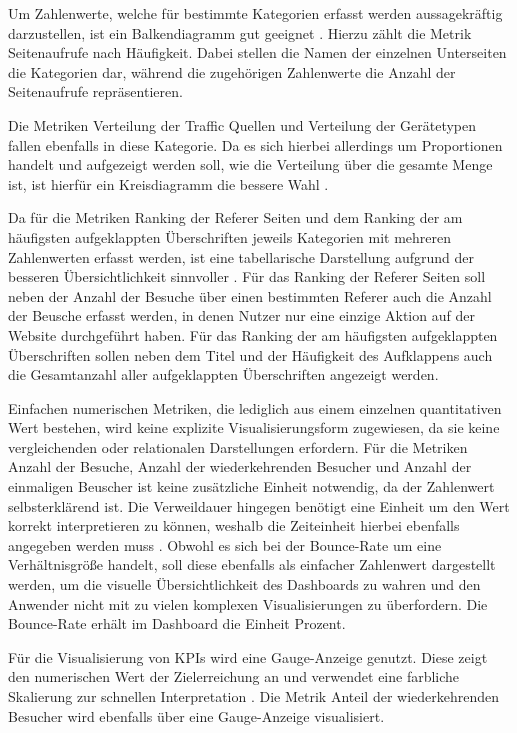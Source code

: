 Um Zahlenwerte, welche für bestimmte Kategorien erfasst werden aussagekräftig darzustellen, ist ein Balkendiagramm gut geeignet \parencite[Kap.5]{Wilke}. Hierzu zählt die Metrik \glqq Seitenaufrufe nach Häufigkeit\grqq{}. Dabei stellen die Namen der einzelnen Unterseiten die Kategorien dar, während die zugehörigen Zahlenwerte die Anzahl der Seitenaufrufe repräsentieren.

Die Metriken \glqq Verteilung der Traffic Quellen\grqq{} und \glqq Verteilung der Gerätetypen\grqq{} fallen ebenfalls in diese Kategorie. Da es sich hierbei allerdings um Proportionen handelt und aufgezeigt werden soll, wie die Verteilung über die gesamte Menge ist, ist hierfür ein Kreisdiagramm die bessere Wahl \parencite[Kap.5]{Wilke}.

Da für die Metriken \glqq Ranking der Referer Seiten\grqq{} und dem \glqq Ranking der am häufigsten aufgeklappten Überschriften\grqq{} jeweils Kategorien mit mehreren Zahlenwerten erfasst werden, ist eine tabellarische Darstellung aufgrund der besseren Übersichtlichkeit sinnvoller \parencite{Auditrium}. Für das \glqq Ranking der Referer Seiten\grqq{} soll neben der Anzahl der Besuche über einen bestimmten Referer auch die Anzahl der Beusche erfasst werden, in denen Nutzer nur eine einzige Aktion auf der Website durchgeführt haben. Für das \glqq Ranking der am häufigsten aufgeklappten Überschriften\grqq{} sollen neben dem Titel und der Häufigkeit des Aufklappens auch die Gesamtanzahl aller aufgeklappten Überschriften angezeigt werden.

Einfachen numerischen Metriken, die lediglich aus einem einzelnen quantitativen Wert bestehen, wird keine explizite Visualisierungsform zugewiesen, da sie keine vergleichenden oder relationalen Darstellungen erfordern. Für die Metriken \glqq Anzahl der Besuche\grqq{}, \glqq Anzahl der wiederkehrenden Besucher\grqq{} und \glqq Anzahl der einmaligen Beuscher\grqq{} ist keine zusätzliche Einheit notwendig, da der Zahlenwert selbsterklärend ist. Die \glqq Verweildauer\grqq{} hingegen benötigt eine Einheit um den Wert korrekt interpretieren zu können, weshalb die Zeiteinheit hierbei ebenfalls angegeben werden muss \parencite[Kap.22]{Wilke}. Obwohl es sich bei der Bounce-Rate um eine Verhältnisgröße handelt, soll diese ebenfalls als einfacher Zahlenwert dargestellt werden, um die visuelle Übersichtlichkeit des Dashboards zu wahren und den Anwender nicht mit zu vielen komplexen Visualisierungen zu überfordern. Die Bounce-Rate erhält im Dashboard die Einheit Prozent.

Für die Visualisierung von KPIs wird eine Gauge-Anzeige genutzt. Diese zeigt den numerischen Wert der Zielerreichung an und verwendet eine farbliche Skalierung zur schnellen Interpretation \parencite{GrafanaGauge}. Die Metrik \glqq Anteil der wiederkehrenden Besucher\grqq{} wird ebenfalls über eine Gauge-Anzeige visualisiert.

